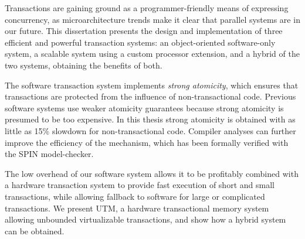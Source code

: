 {\small

Transactions are gaining ground as a programmer-friendly means of
expressing concurrency, as microarchitecture trends make it
clear that parallel systems are in our future.  This dissertation
presents the design and implementation of three efficient and powerful
transaction systems: an object-oriented software-only system, a
scalable system using a custom processor extension, and a hybrid of
the two systems, obtaining the benefits of both.

The software transaction system implements \textit{strong atomicity},
which ensures that transactions are protected from the influence of
non-transactional code.  Previous software systems use weaker
atomicity guarantees because strong atomicity is presumed to be too
expensive.  In this thesis strong atomicity is obtained with as little
as 15\% slowdown for non-transactional code.  Compiler analyses can
further improve the efficiency of the mechanism, which has been
formally verified with the SPIN model-checker.

The low overhead of our software system allows it to be profitably
combined with a hardware transaction system to provide fast execution
of short and small transactions, while allowing fallback to software
for large or complicated transactions.  We present UTM, a hardware
transactional memory system allowing unbounded virtualizable
transactions, and show how a hybrid system can be obtained.
}
